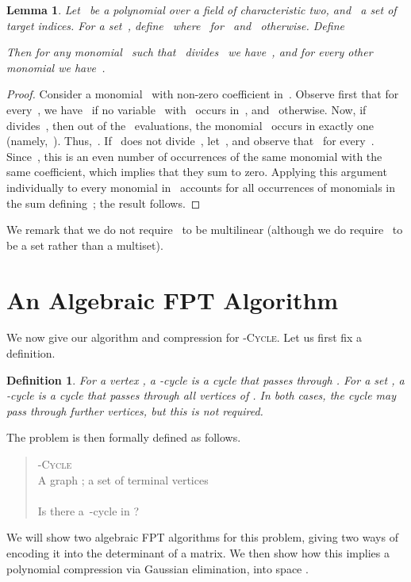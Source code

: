 \documentclass[a4paper,11pt]{article}
\newtheorem{definition}{Definition}
\newtheorem{lemma}{Lemma}
\begin{document}
\begin{lemma}
\label{lm:polypie}
Let~ be a polynomial over a field of characteristic two, 
and~ a set of target indices. For a set~,
define~ where~ for~ and~
otherwise. Define 

Then for any monomial~ such that~ divides~ we have~, 
and for every other monomial we have~.
\end{lemma}
\begin{proof}
Consider a monomial~ with non-zero coefficient in~. Observe first that for every~, we have~ if no variable~ with~ occurs in~,
and~ otherwise. Now, if~ divides~, then out of the~ evaluations,
the monomial~ occurs in exactly one (namely,~). Thus,~. 
If~ does not divide~, let~,
and observe that~ for every~. Since~,
this is an even number of occurrences of the same monomial with the same coefficient,
which implies that they sum to zero. Applying this argument individually to every monomial
in~ accounts for all occurrences of monomials in the sum defining~; the result
follows.
\end{proof}

We remark that we do not require~ to be multilinear (although we do require~ to be a
set rather than a multiset).

\section{An Algebraic FPT Algorithm}
\label{sec:themeat}

We now give our algorithm and compression for \textsc{-Cycle}. Let us first fix a
definition. 

\begin{definition}
For a vertex , a -cycle is a cycle that passes through . For a set , a -cycle is a cycle that passes through all vertices of . In both
cases, the cycle may pass through further vertices, but this is not required.
\end{definition}

The problem is then formally defined as follows. 

\begin{quotation}
\textsc{-Cycle}
\\  A graph ; a set  of terminal vertices
\\  
\\  Is there a~-cycle in ?
\end{quotation}

We will show two algebraic FPT algorithms for this problem, giving two ways of encoding it
into the determinant of a matrix. We then show how this implies a polynomial compression
via Gaussian elimination, into space .
\end{document}
